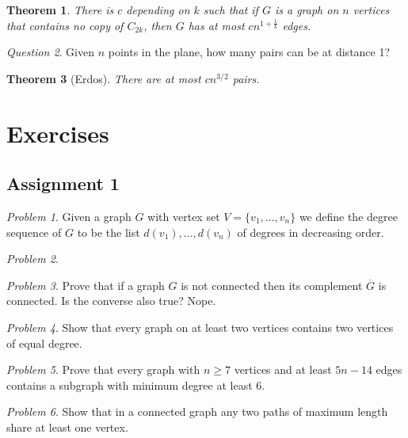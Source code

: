 \documentclass[10pt, fleqn, a4paper, landscape]{article}
\theoremstyle{plain} %
\newtheorem{thm}{Theorem}
\theoremstyle{remark} %
\newtheorem{que}[thm]{Question}
\newtheorem{problem}{Problem}
\theoremstyle{definition} %
\begin{document}
\begin{multicols}{3}
\begin{tiny}
\begin{thm}
There is $c$ depending on $k$ such that if $G$ is a graph on $n$ vertices that contains no copy of $C_{2k}$, then $G$ has at most $cn^{1+\frac{1}{k}}$ edges.
\end{thm}

\begin{que}
Given $n$ points in the plane, how many pairs can be at distance 1?
\end{que}

\begin{thm}[Erdos]
There are at most $cn^{3/2}$ pairs.
\end{thm}

\section{Exercises}
\subsection{Assignment 1}

\begin{problem}
Given a graph $G$ with vertex set $V = \{v_1,\dots,v_n\}$ we define the degree sequence of $G$ to be the list $d(v_1),\dots, d(v_n)$ of degrees in decreasing order.
\end{problem}

\begin{problem}

\end{problem}

\begin{problem}
Prove that if a graph $G$ is not connected then its complement $\overline{G}$ is connected. Is the converse also true? Nope.
\end{problem}

\begin{problem}
Show that every graph on at least two vertices contains two vertices of equal
degree.
\end{problem}

\begin{problem}
Prove that every graph with $n \ge 7$ vertices and at least $5n- 14$ edges contains a subgraph with minimum degree at least 6.
\end{problem}

\begin{problem}
Show that in a connected graph any two paths of maximum length share at least
one vertex.
\end{problem}


\end{tiny}
\end{multicols}
\end{document}
